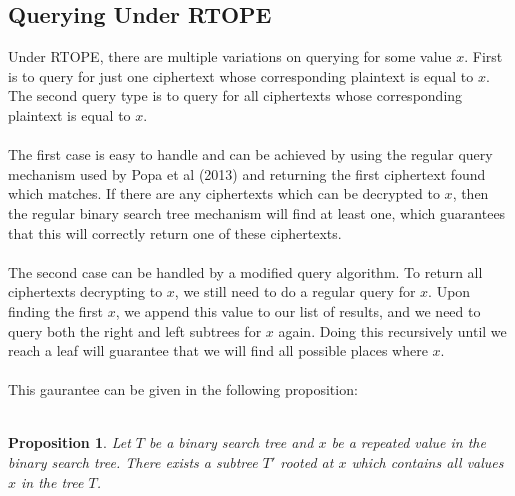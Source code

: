 \documentclass[12pt]{article}
\newtheorem{proposition}[theorem]{Proposition}
\begin{document}
\subsection{Querying Under RTOPE}
Under RTOPE, there are multiple variations on querying for some value $x$. First is to query for just one ciphertext whose corresponding plaintext is equal to $x$. The second query type is to query for all ciphertexts whose corresponding plaintext is equal to $x$. \\ \\
The first case is easy to handle and can be achieved by using the regular query mechanism used by Popa et al (2013) and returning the first ciphertext found which matches. If there are any ciphertexts which can be decrypted to $x$, then the regular binary search tree mechanism will find at least one, which guarantees that this will correctly return one of these ciphertexts. \\ \\
The second case can be handled by a modified query algorithm. To return all ciphertexts decrypting to $x$, we still need to do a regular query for $x$. Upon finding the first $x$, we append this value to our list of results, and we need to query both the right and left subtrees for $x$ again. Doing this recursively until we reach a leaf will guarantee that we will find all possible places where $x$. \\ \\
This gaurantee can be given in the following proposition: \\ \\
  \begin{proposition}
    Let $T$ be a binary search tree and $x$ be a repeated value in the binary search tree. There exists a subtree $T'$ rooted at $x$ which contains all values $x$ in the tree $T$.
  \end{proposition}
\end{document}
